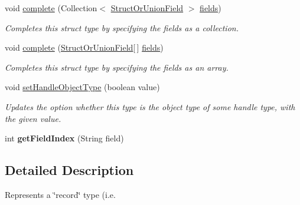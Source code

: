 \begin{DoxyCompactItemize}
void \hyperlink{interfaceedu_1_1udel_1_1cis_1_1vsl_1_1civl_1_1model_1_1IF_1_1type_1_1CIVLStructOrUnionType_a5bf832121ab1e9fc99ad0b0070822a69}{complete} (Collection$<$ \hyperlink{interfaceedu_1_1udel_1_1cis_1_1vsl_1_1civl_1_1model_1_1IF_1_1type_1_1StructOrUnionField}{Struct\+Or\+Union\+Field} $>$ \hyperlink{interfaceedu_1_1udel_1_1cis_1_1vsl_1_1civl_1_1model_1_1IF_1_1type_1_1CIVLStructOrUnionType_ab62a9776d13c476bd9b64cbafd7c2c77}{fields})
\begin{DoxyCompactList}\small\item\em Completes this struct type by specifying the fields as a collection. \end{DoxyCompactList}\item 
void \hyperlink{interfaceedu_1_1udel_1_1cis_1_1vsl_1_1civl_1_1model_1_1IF_1_1type_1_1CIVLStructOrUnionType_acc4501ea0a3d7ba21b58c7bd13ff33c7}{complete} (\hyperlink{interfaceedu_1_1udel_1_1cis_1_1vsl_1_1civl_1_1model_1_1IF_1_1type_1_1StructOrUnionField}{Struct\+Or\+Union\+Field}\mbox{[}$\,$\mbox{]} \hyperlink{interfaceedu_1_1udel_1_1cis_1_1vsl_1_1civl_1_1model_1_1IF_1_1type_1_1CIVLStructOrUnionType_ab62a9776d13c476bd9b64cbafd7c2c77}{fields})
\begin{DoxyCompactList}\small\item\em Completes this struct type by specifying the fields as an array. \end{DoxyCompactList}\item 
void \hyperlink{interfaceedu_1_1udel_1_1cis_1_1vsl_1_1civl_1_1model_1_1IF_1_1type_1_1CIVLStructOrUnionType_a53b4201f98801190209ce9e49b00f183}{set\+Handle\+Object\+Type} (boolean value)
\begin{DoxyCompactList}\small\item\em Updates the option whether this type is the object type of some handle type, with the given value. \end{DoxyCompactList}\item 
\hypertarget{interfaceedu_1_1udel_1_1cis_1_1vsl_1_1civl_1_1model_1_1IF_1_1type_1_1CIVLStructOrUnionType_ae14ab2c94cd3252065a851c1be63e987}{}int {\bfseries get\+Field\+Index} (String field)\label{interfaceedu_1_1udel_1_1cis_1_1vsl_1_1civl_1_1model_1_1IF_1_1type_1_1CIVLStructOrUnionType_ae14ab2c94cd3252065a851c1be63e987}

\end{DoxyCompactItemize}


\subsection{Detailed Description}
Represents a \char`\"{}record\char`\"{} type (i.\+e. 

